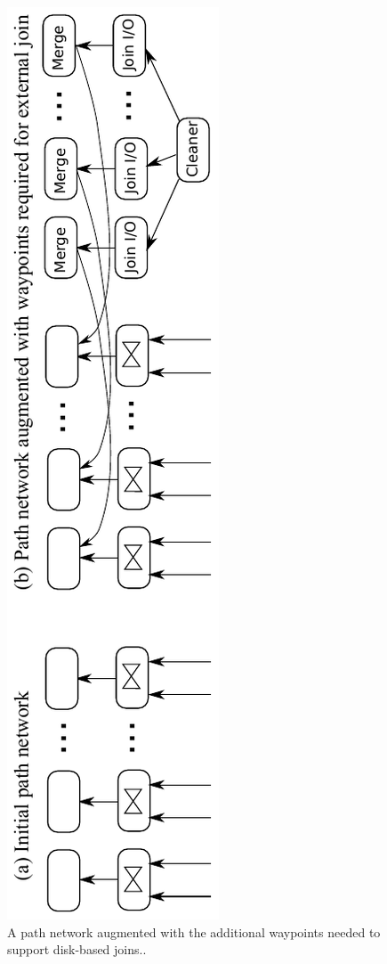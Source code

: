 \documentclass{sig-alternate}
\renewcommand\:{\colon} %
\begin{document}
\begin{figure}
\includegraphics[scale=0.5, angle=-90]{Augmented.pdf}
\caption{A path network augmented with the additional waypoints needed to support disk-based joins..} \label{augmented}
\end{figure}
\end{document}
